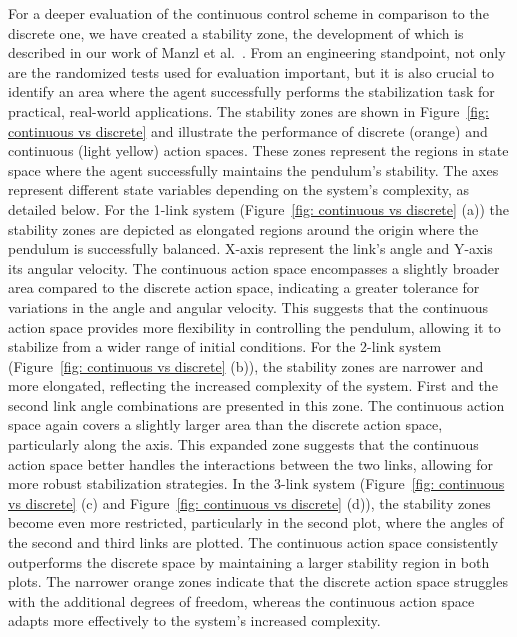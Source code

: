 For a deeper evaluation of the continuous control scheme in comparison to the discrete one, we have created a stability zone, the development of which is described in our work of Manzl et al.~\cite{manzl2023relrl}. From an engineering standpoint, not only are the randomized tests used for evaluation important, but it is also crucial to identify an area where the agent successfully performs the stabilization task for practical, real-world applications. The stability zones are shown in Figure~\ref{fig: continuous vs discrete} and illustrate the performance of discrete (orange) and continuous (light yellow) action spaces. These zones represent the regions in state space where the agent successfully maintains the pendulum's stability. The axes represent different state variables depending on the system's complexity, as detailed below.
For the 1-link system (Figure~\ref{fig: continuous vs discrete} (a)) the stability zones are depicted as elongated regions around the origin where the pendulum is successfully balanced. X-axis represent the link's angle and Y-axis its angular velocity. The continuous action space encompasses a slightly broader area compared to the discrete action space, indicating a greater tolerance for variations in the angle and angular velocity. This suggests that the continuous action space provides more flexibility in controlling the pendulum, allowing it to stabilize from a wider range of initial conditions. For the 2-link system (Figure~\ref{fig: continuous vs discrete} (b)), the stability zones are narrower and more elongated, reflecting the increased complexity of the system. First and the second link angle combinations are presented in this zone. The continuous action space again covers a slightly larger area than the discrete action space, particularly along the axis. This expanded zone suggests that the continuous action space better handles the interactions between the two links, allowing for more robust stabilization strategies. In the 3-link system (Figure~\ref{fig: continuous vs discrete} (c) and Figure~\ref{fig: continuous vs discrete} (d)), the stability zones become even more restricted, particularly in the second plot, where the angles of the second and third links are plotted. The continuous action space consistently outperforms the discrete space by maintaining a larger stability region in both plots. The narrower orange zones indicate that the discrete action space struggles with the additional degrees of freedom, whereas the continuous action space adapts more effectively to the system's increased complexity.

